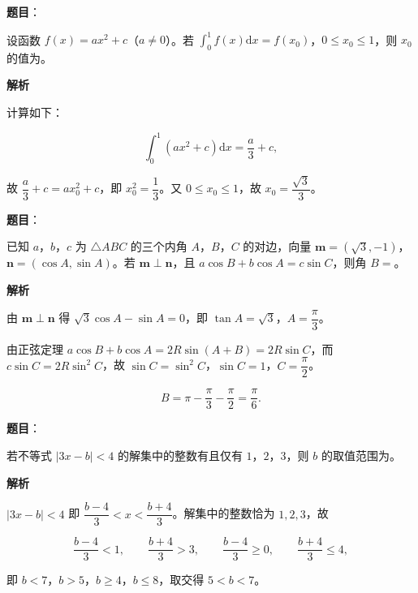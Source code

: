 \begin{answer}

\textbf{题目}：

设函数 $f(x)=ax^2+c$（$a\neq0$）。若 $\int_0^1f(x)\mathrm dx=f(x_0)$，$0\leqslant x_0\leqslant1$，则 $x_0$ 的值为\gkblank{}。

\textbf{解析}

计算如下：

\nopagebreak[4]
\[\int_0^1\left(ax^2+c\right)\mathrm dx=\frac a3+c,\]

故 $\dfrac a3+c=ax_0^2+c$，即 $x_0^2=\dfrac13$。又 $0\leqslant x_0\leqslant1$，故 $x_0=\dfrac{\sqrt3}3$。


\end{answer}
\begin{answer}

\textbf{题目}：

已知 $a$，$b$，$c$ 为 $\triangle ABC$ 的三个内角 $A$，$B$，$C$ 的对边，向量 $\boldsymbol m=(\sqrt3,-1)$，$\boldsymbol n=(\cos A,\sin A)$。若 $\boldsymbol m\perp\boldsymbol n$，且 $a\cos B+b\cos A=c\sin C$，则角 $B=$\gkblank{}。

\textbf{解析}

由 $\boldsymbol m\perp\boldsymbol n$ 得 $\sqrt3\cos A-\sin A=0$，即 $\tan A=\sqrt3$，$A=\dfrac{\pi}3$。

由正弦定理 $a\cos B+b\cos A=2R\sin(A+B)=2R\sin C$，而 $c\sin C=2R\sin^2C$，故 $\sin C=\sin^2C$，$\sin C=1$，$C=\dfrac{\pi}2$。

\nopagebreak[4]
\[B=\pi-\frac{\pi}3-\frac{\pi}2=\frac{\pi}6.\]


\end{answer}
\begin{answer}

\textbf{题目}：

若不等式 $|3x-b|<4$ 的解集中的整数有且仅有 $1$，$2$，$3$，则 $b$ 的取值范围为\gkblank{}。

\textbf{解析}

$|3x-b|<4$ 即 $\dfrac{b-4}3<x<\dfrac{b+4}3$。解集中的整数恰为 $1,2,3$，故

\nopagebreak[4]
\[\frac{b-4}3<1,\qquad \frac{b+4}3>3,\qquad \frac{b-4}3\geqslant0,\qquad \frac{b+4}3\leqslant4,\]

即 $b<7$，$b>5$，$b\geqslant4$，$b\leqslant8$，取交得 $5<b<7$。


\end{answer}
